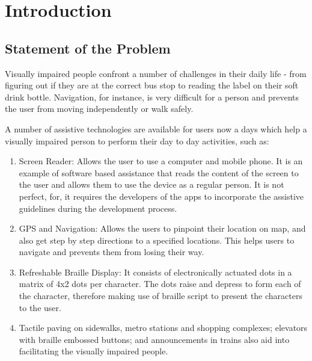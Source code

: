 \documentclass[
10pt, %
a4paper, %
oneside, %
headinclude,footinclude, %
BCOR5mm, %
]{scrartcl}
\begin{document}
{\let\thefootnote\relax{}}

{\let\thefootnote\relax{}}


\newpage %


\section{Introduction}
\subsection{Statement of the Problem}
Visually impaired people confront a number of challenges in their daily life - from figuring out if they are at the correct bus stop to reading the label on their soft drink bottle. Navigation, for instance, is very difficult for a person and prevents the user from moving independently or walk safely.

A number of assistive technologies are available for users now a days which help a visually impaired person to perform their day to day activities, such as:

\begin{enumerate}
	\item Screen Reader: Allows the user to use a computer and mobile phone. It is an example of software based assistance that reads the content of the screen to the user and allows them to use the device as a regular person. It is not perfect, for, it requires the developers of the apps to incorporate the assistive guidelines during the development process.
	\item GPS and Navigation: Allows the users to pinpoint their location on map, and also get step by step directions to a specified locations. This helps users to navigate and prevents them from losing their way.
	\item Refreshable Braille Display: It consists of electronically actuated dots in a matrix of 4x2 dots per character. The dots raise and depress to form each of the character, therefore making use of braille script to present the characters to the user.
	\item Tactile paving on sidewalks, metro stations and shopping complexes; elevators with braille embossed buttons; and announcements in trains also aid into facilitating the visually impaired people. 
\end{enumerate}
\end{document}
